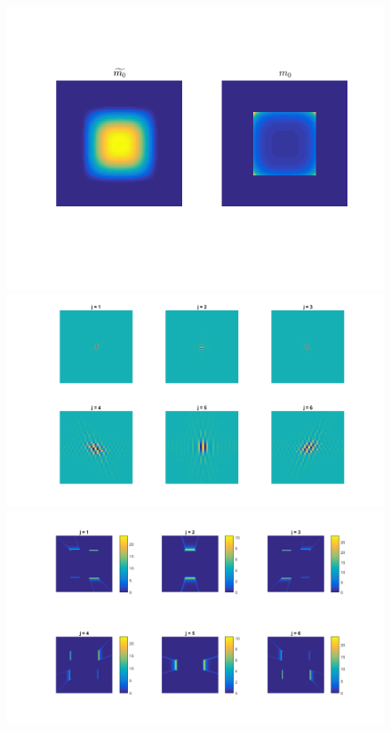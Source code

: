 \documentclass[]{article}
\begin{document}


\newpage
\begin{figure}[h]
\centering
\includegraphics[width = .7\textwidth]{smooth_extended_m0dual.png}\\
\includegraphics[width = \textwidth]{quincunx_wavelets_extended_m0dual.png}\\
\includegraphics[width = \textwidth]{m_extended_m0dual.png}
\end{figure}
\end{document}
